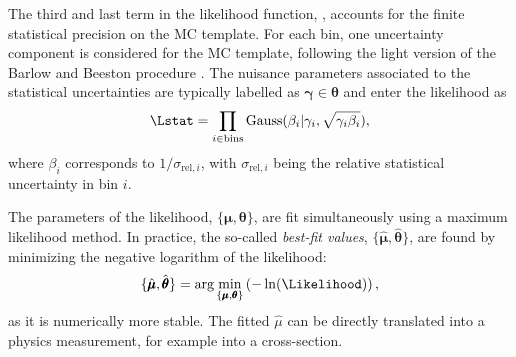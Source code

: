 The third and last term in the likelihood function, \Lstat, 
accounts for the finite statistical precision on the MC template. For each bin, one uncertainty component is considered for the MC template, following the light version of the Barlow and Beeston procedure . The nuisance parameters associated to the statistical uncertainties are typically labelled as $\pmb{\gamma} \in \pmb{\theta}$ and enter the likelihood as
\begin{equation}
    \Lstat = \prod_{i \in \text{bins}} \text{Gauss}(\beta_i | \gamma_i, \sqrt{\gamma_i \beta_i}),    
\end{equation}
where $\beta_i$ corresponds to $1 / \sigma_{\text{rel}, i}$, with $\sigma_{\text{rel}, i}$ being the relative statistical uncertainty in bin $i$. 




The parameters of the likelihood, $\{\pmb{\mu}, \pmb{\theta} \}$, are fit simultaneously using a maximum likelihood method. 
In practice, the so-called \emph{best-fit values}, $\{\hat{\pmb{\mu}}, \hat{\pmb{\theta}} \}$, are found by minimizing the negative logarithm of the likelihood:
\begin{equation}
    \label{eq:best-fit-values}
    \{\hat{\pmb{\mu}}, \hat{\pmb{\theta}} \} = \text{arg} \min_{\{\pmb{\mu}, \pmb{\theta}\}} \left( - \ln (\Likelihood) \right),
\end{equation}
as it is numerically more stable.
The fitted $\hat{\mu}$ can be directly translated into a physics measurement, for example into a cross-section. 



